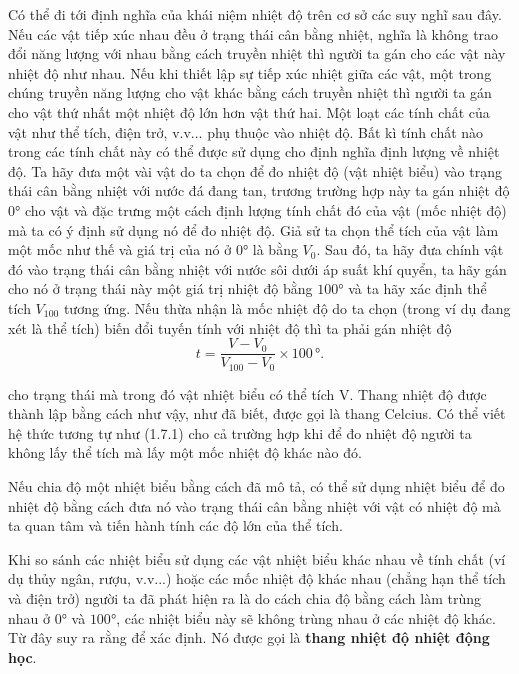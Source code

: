 Có thể đi tới định nghĩa của khái niệm nhiệt độ trên cơ sở các suy nghĩ sau đây. Nếu các vật tiếp xúc nhau đều ở trạng thái cân bằng nhiệt, nghĩa là không trao đổi năng lượng với nhau bằng cách truyền nhiệt thì người ta gán cho các vật này nhiệt độ như nhau. Nếu khi thiết lập sự tiếp xúc nhiệt giữa các vật, một trong chúng truyền năng lượng cho vật khác bằng cách truyền nhiệt thì người ta gán cho vật thứ nhất một nhiệt độ lớn hơn vật thứ hai. Một loạt các tính chất của vật như thể tích, điện trở, v.v... phụ thuộc vào nhiệt độ. Bất kì tính chất nào trong các tính chất này có thể được sử dụng cho định nghĩa định lượng về nhiệt độ.
Ta hãy đưa một vài vật do ta chọn để đo nhiệt độ (vật nhiệt biểu) vào trạng thái cân bằng nhiệt với nước đá đang tan, trương trường hợp này ta gán nhiệt độ $0°$ cho vật và đặc trưng một cách định lượng tính chất đó của vật (mốc nhiệt độ) mà ta có ý định sử dụng nó để đo nhiệt độ. Giả sử ta chọn thể tích của vật làm một mốc như thế và giá trị của nó ở $0°$ là bằng $V_0$. Sau đó, ta hãy đưa chính vật đó vào trạng thái cân bằng nhiệt với nước sôi dưới áp suất khí quyển, ta hãy gán cho nó ở trạng thái này một giá trị nhiệt độ bằng $100°$ và ta hãy xác định thể tích $V_{100}$ tương ứng. Nếu thừa nhận là mốc nhiệt độ do ta chọn (trong ví dụ đang xét là thể tích) biến đổi tuyến tính với nhiệt độ thì ta phải gán nhiệt độ
\begin{equation}\label{eq:10_14}
	t = \frac{V - V_0}{V_{100} - V_0}\times 100\,\text{°}.
\end{equation}

\noindent
cho trạng thái mà trong đó vật nhiệt biểu có thể tích V. Thang nhiệt độ được thành lập bằng cách như vậy, như đã biết, được gọi là thang Celcius. Có thể viết hệ thức tương tự như (1.7.1) cho cả trường hợp khi để đo nhiệt độ người ta không lấy thể tích mà lấy một mốc nhiệt độ khác nào đó.

Nếu chia độ một nhiệt biểu bằng cách đã mô tả, có thể sử dụng nhiệt biểu để đo nhiệt độ bằng cách đưa nó vào trạng thái cân bằng nhiệt với vật có nhiệt độ mà ta quan tâm và tiến hành tính các độ lớn của thể tích.

Khi so sánh các nhiệt biểu sử dụng các vật nhiệt biểu khác nhau về tính chất (ví dụ thủy ngân, rượu, v.v...) hoặc các mốc nhiệt độ khác nhau (chẳng hạn thể tích và điện trở) người ta đã phát hiện ra là do cách chia độ bằng cách làm trùng nhau ở $0°$ và $100°$, các nhiệt biểu này sẽ không trùng nhau ở các nhiệt độ khác. Từ đây suy ra rằng để xác định. Nó được gọi là \textbf{thang nhiệt độ nhiệt động học}.

